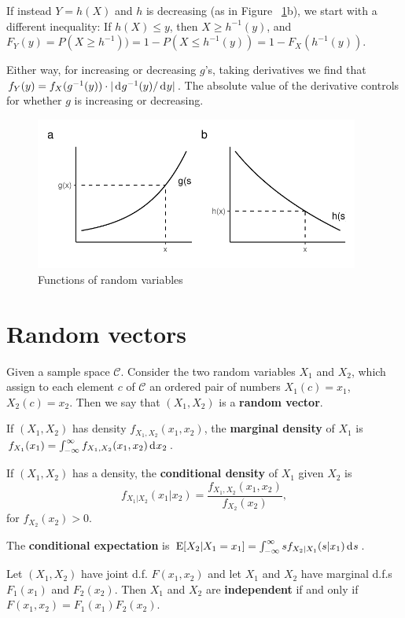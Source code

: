 \documentclass[twoside]{article}
\begin{document}
If instead $Y=h(X)$ and $h$ is decreasing (as in Figure ~\ref{fig:frv}b), we
start with a different inequality: If $h(X) \leq y$, then $X\geq h^{-1}(y)$,
and $F_Y(y) = P(X\geq h^{-1})) = 1 - P(X\leq h^{-1}(y)) = 1 - F_X(h^{-1}(y))$.

Either way, for increasing or decreasing $g$'s, taking derivatives we find that 
$f_Y(y) = f_X(g^{-1}(y)) \cdot | \rd g^{-1}(y)/\rd y|$.
The absolute value of the derivative controls for whether $g$ is increasing or decreasing.


\begin{figure}[tb]
\includegraphics[width=0.95\textwidth]{../graphs/transformation_of_RV}

\caption{Functions of random variables}\label{fig:frv}
\end{figure}



\section{Random vectors}
Given a sample space $\mathcal{C}$. Consider the
two random variables $X_1$ and $X_2$, which assign to each element
$c$ of $\mathcal{C}$ an ordered pair of numbers
$X_1(c)=x_1$, $X_2(c)=x_2$. Then we say that $(X_1,X_2)$ is a
\textbf{random vector}. 

If $(X_1,X_2)$ has density $f_{X_1,X_2}(x_1,x_2)$, the \textbf{marginal density}
of $X_1$ is  $ f_{X_1}(x_1) = \int_{-\infty}^\infty f_{X_1,X_2}(x_1,x_2)\rd x_2$.

If $(X_1,X_2)$ has a density, the \textbf{conditional density} of $X_1$ given $X_2$ is
\[f_{X_1|X_2}(x_1|x_2)=\frac{f_{X_1,X_2}(x_1,x_2)}{f_{X_2}(x_2)},\]
for $f_{X_2}(x_2)>0$.

The \textbf{conditional expectation} is $\E[X_2|X_1=x_1] = \int_{-\infty}^\infty s
f_{X_2|X_1}(s|x_1) \rd s$.

Let $(X_1,X_2)$ have joint d.f. $F(x_1,x_2)$ and let $X_1$ and $X_2$ 
have marginal d.f.s $F_1(x_1)$
  and $F_2(x_2)$. Then $X_1$ and $X_2$ are \textbf{independent} if and only if 
$F(x_1,x_2)= F_1(x_1) F_2(x_2)$. 
\end{document}
